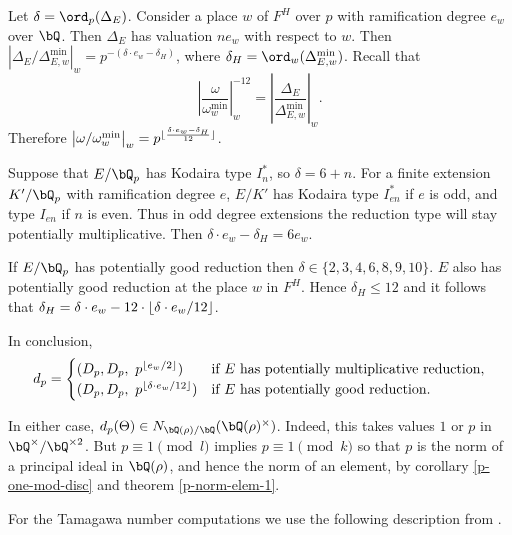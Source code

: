 Let $\delta = \ord_p(\Delta_E)$. Consider a place $w$ of $F^H$ over $p$ with ramification degree  $e_w$over $\bQ$. Then $\Delta_E$ has valuation $n e_w$ with respect to $w$. Then $\left| \Delta_E / \Delta_{E, w}^{\min} \right|_w = p^{-(\delta\cdot e_w - \delta_H)}$, where $\delta_H = \ord_w(\Delta_{E, w}^{\min})$.
Recall that
\[ \left| \frac{\omega}{\omega_{w}^{\min}} \right|_{w}^{-12} = \left| \frac{\Delta_E}{\Delta_{E, w}^{\min}} \right|_w .\] 
Therefore $\left| \omega / \omega_{w}^{\min} \right|_w = p^{\lfloor\frac{\delta\cdot e_w - \delta_H}{12}\rfloor}$.

Suppose that $E / \bQ_p$ has Kodaira type $I_n^*$, so $\delta = 6 + n$. For a finite extension $K' / \bQ_p$ with ramification degree $e$, $E / K'$ has Kodaira type $I_{en}^*$ if $e$ is odd, and type $I_{en}$ if $n$ is even. Thus in odd degree extensions the reduction type will stay potentially multiplicative. Then $\delta \cdot e_w - \delta_H = 6 e_w$.

If $E / \bQ_p$ has potentially good reduction then $\delta \in \{2,3,4,6,8,9,10 \}$. $E$ also has potentially good reduction at the place $w$ in $F^H$. Hence $\delta_H \leq 12$ and it follows that $\delta_H = \delta \cdot e_w - 12 \cdot \lfloor\delta \cdot e_w /12\rfloor$.

In conclusion, 
\[ d_p = 
    \begin{cases}
        (D_p, D_p,\ p^{\lfloor e_w /2\rfloor}) & \text{if } E \text{ has potentially multiplicative reduction}, \\
        (D_p, D_p,\ p^{\lfloor\delta \cdot e_w/12\rfloor}) & \text{if } E \text { has potentially good reduction}.
    \end{cases}
    \]

In either case, $d_p(\Theta) \in N_{\bQ(\rho) / \bQ}(\bQ(\rho)^{\times})$. Indeed, this takes values $1$ or $p$ in $\bQ^{\times} / \bQ^{\times 2}$. But $p \equiv 1 \pmod l$ implies $p \equiv 1 \pmod k$ so that $p$ is the norm of a principal ideal in $\bQ(\rho)$, and hence the norm of an element, by corollary \ref{p-one-mod-disc} and theorem \ref{p-norm-elem-1}.


For the Tamagawa number computations we use the following description from \cite{reg-const}.

